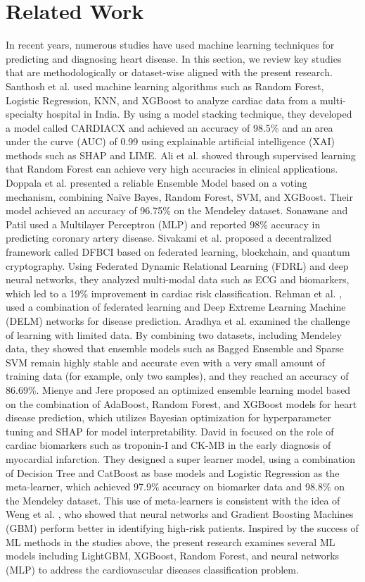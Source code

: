 \documentclass[twoside]{article}
\begin{document}
\section{Related Work}
In recent years, numerous studies have used machine learning techniques for predicting and diagnosing heart disease. In this section, we review key studies that are methodologically or dataset-wise aligned with the present research. Santhosh et al. \cite{Santhosh2025} used machine learning algorithms such as Random Forest, Logistic Regression, KNN, and XGBoost to analyze cardiac data from a multi-specialty hospital in India. By using a model stacking technique, they developed a model called CARDIACX and achieved an accuracy of 98.5\% and an area under the curve (AUC) of 0.99 using explainable artificial intelligence (XAI) methods such as SHAP and LIME. Ali et al. \cite{Ali2021} showed through supervised learning that Random Forest can achieve very high accuracies in clinical applications. Doppala et al. \cite{Doppala2022} presented a reliable Ensemble Model based on a voting mechanism, combining Naïve Bayes, Random Forest, SVM, and XGBoost. Their model achieved an accuracy of 96.75\% on the Mendeley dataset. Sonawane and Patil \cite{Sonawane2014} used a Multilayer Perceptron (MLP) and reported 98\% accuracy in predicting coronary artery disease. Sivakami et al. \cite{Sivakami2026} proposed a decentralized framework called DFBCI based on federated learning, blockchain, and quantum cryptography. Using Federated Dynamic Relational Learning (FDRL) and deep neural networks, they analyzed multi-modal data such as ECG and biomarkers, which led to a 19\% improvement in cardiac risk classification. Rehman et al. \cite{Rehman2022}, used a combination of federated learning and Deep Extreme Learning Machine (DELM) networks for disease prediction. Aradhya et al. \cite{Manjunath2024} examined the challenge of learning with limited data. By combining two datasets, including Mendeley data, they showed that ensemble models such as Bagged Ensemble and Sparse SVM remain highly stable and accurate even with a very small amount of training data (for example, only two samples), and they reached an accuracy of 86.69\%. Mienye and Jere \cite{Mienye2024} proposed an optimized ensemble learning model based on the combination of AdaBoost, Random Forest, and XGBoost models for heart disease prediction, which utilizes Bayesian optimization for hyperparameter tuning and SHAP for model interpretability. David in \cite{David2021} focused on the role of cardiac biomarkers such as troponin-I and CK-MB in the early diagnosis of myocardial infarction. They designed a super learner model, using a combination of Decision Tree and CatBoost as base models and Logistic Regression as the meta-learner, which achieved 97.9\% accuracy on biomarker data and 98.8\% on the Mendeley dataset. This use of meta-learners is consistent with the idea of Weng et al. \cite{Weng2017}, who showed that neural networks and Gradient Boosting Machines (GBM) perform better in identifying high-risk patients. Inspired by the success of ML methods in the studies above, the present research examines several ML models including LightGBM, XGBoost, Random Forest, and neural networks (MLP) to address the cardiovascular diseases classification problem.
\end{document}
